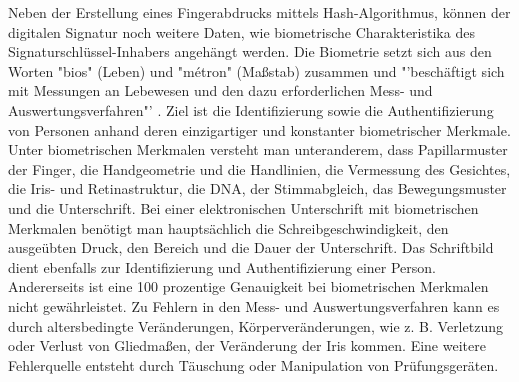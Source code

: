 Neben der Erstellung eines Fingerabdrucks mittels Hash-Algorithmus, können der digitalen Signatur noch weitere Daten, wie biometrische Charakteristika des Signaturschlüssel-Inhabers angehängt werden. Die Biometrie setzt sich aus den Worten "bios" (Leben) und "métron" (Maßstab) zusammen und "'beschäftigt sich mit Messungen an Lebewesen und den dazu erforderlichen Mess- und Auswertungsverfahren"' \cite{bioMet1}. Ziel ist die Identifizierung sowie die Authentifizierung von Personen anhand deren einzigartiger und konstanter biometrischer Merkmale. Unter biometrischen Merkmalen versteht man unteranderem, dass Papillarmuster der Finger, die Handgeometrie und die Handlinien, die Vermessung des Gesichtes, die Iris- und Retinastruktur, die DNA, der Stimmabgleich, das Bewegungsmuster und die Unterschrift. Bei einer elektronischen Unterschrift mit biometrischen Merkmalen benötigt man hauptsächlich die Schreibgeschwindigkeit, den ausgeübten Druck, den Bereich und die Dauer der Unterschrift. Das Schriftbild dient ebenfalls zur Identifizierung und Authentifizierung einer Person. Andererseits ist eine 100 prozentige Genauigkeit bei biometrischen Merkmalen nicht gewährleistet. Zu Fehlern in den Mess- und Auswertungsverfahren kann es durch altersbedingte Veränderungen, Körperveränderungen, wie z. B. Verletzung oder Verlust von Gliedmaßen, der Veränderung der Iris kommen. Eine weitere Fehlerquelle entsteht durch Täuschung oder Manipulation von Prüfungsgeräten. \cite{bioMet2}\cite{bioMet3}
